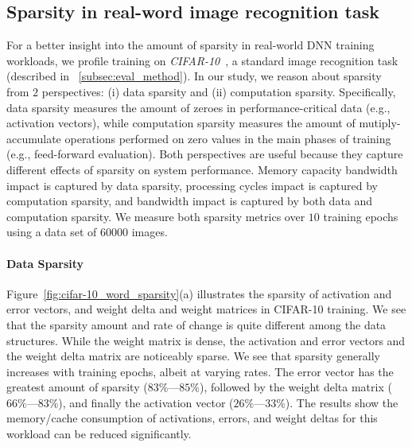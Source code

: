 \subsection{Sparsity in real-word image recognition task}
\label{subsec:sparsity_profile}

For a better insight into the amount of sparsity in real-world DNN training workloads, we profile training on {\it CIFAR-10}~\cite{KrizhevskyThesis}, a standard image recognition task (described in ~\ref{subsec:eval_method}).  In our study, we reason about sparsity from $2$ perspectives: (i) data sparsity and (ii) computation sparsity.  Specifically, data sparsity measures the amount of zeroes in performance-critical data (e.g., activation vectors), while computation sparsity measures the amount of mutiply-accumulate operations performed on zero values in the main phases of training (e.g., feed-forward evaluation).  Both perspectives are useful because they capture different effects of sparsity on system performance.  Memory capacity bandwidth impact is captured by data sparsity, processing cycles impact is captured by computation sparsity, and bandwidth impact is captured by both data and computation sparsity.  We measure both sparsity metrics over $10$ training epochs using a data set of $60000$ images. 

\paragraph{Data Sparsity} Figure~\ref{fig:cifar-10_word_sparsity}(a) illustrates the sparsity of activation and error vectors, and weight delta and weight matrices in CIFAR-10 training.  We see that the sparsity amount and rate of change is quite different among the data structures.  While the weight matrix is dense, the activation and error vectors and the weight delta matrix are noticeably sparse.  We see that sparsity generally increases with training epochs, albeit at varying rates.  The error vector has the greatest amount of sparsity ($83\%$---$85\%$), followed by the weight delta matrix ($66\%$---$83\%$), and finally the activation vector ($26\%$---$33\%$).  The results show the memory/cache consumption of activations, errors, and weight deltas for this workload can be reduced significantly. 

